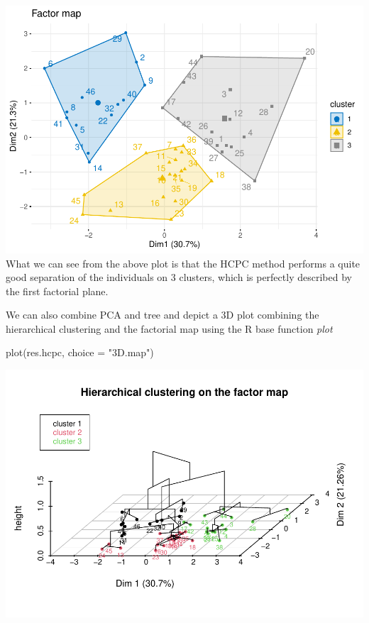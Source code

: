\documentclass[
]{article}
\newenvironment{Shaded}{\begin{snugshade}}{\end{snugshade}}
\newcommand{\AttributeTok}[1]{\textcolor[rgb]{0.77,0.63,0.00}{#1}}
\newcommand{\FunctionTok}[1]{\textcolor[rgb]{0.00,0.00,0.00}{#1}}
\newcommand{\NormalTok}[1]{#1}
\newcommand{\StringTok}[1]{\textcolor[rgb]{0.31,0.60,0.02}{#1}}
\begin{document}
\includegraphics{clustering_files/figure-latex/unnamed-chunk-55-1.pdf}
What we can see from the above plot is that the HCPC method performs a
quite good separation of the individuals on 3 clusters, which is
perfectly described by the first factorial plane.

We can also combine PCA and tree and depict a 3D plot combining the
hierarchical clustering and the factorial map using the R base function
\emph{plot}

\begin{Shaded}
\begin{Highlighting}[]
\FunctionTok{plot}\NormalTok{(res.hcpc, }\AttributeTok{choice =} \StringTok{"3D.map"}\NormalTok{)}
\end{Highlighting}
\end{Shaded}

\includegraphics{clustering_files/figure-latex/unnamed-chunk-56-1.pdf}
\end{document}
